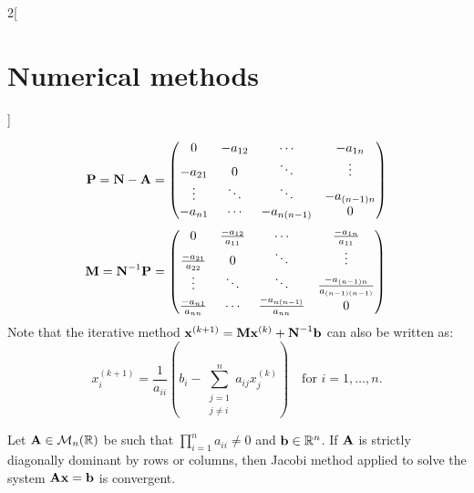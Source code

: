 \documentclass[../../../main.tex]{subfiles}
\begin{document}
\begin{multicols}{2}[\section{Numerical methods}]
\begin{definition}
        \begin{equation*}
            \boldsymbol{\mathrm{P}}=\boldsymbol{\mathrm{N}}-\boldsymbol{\mathrm{A}}=
            \begin{pmatrix}
                0       & -a_{12} & \cdots      & -a_{1n}     \\
                -a_{21} & 0       & \ddots      & \vdots      \\
                \vdots  & \ddots  & \ddots      & -a_{(n-1)n} \\
                -a_{n1} & \cdots  & -a_{n(n-1)} & 0
            \end{pmatrix}
        \end{equation*}
        \begin{equation*}
            \boldsymbol{\mathrm{M}}=\boldsymbol{\mathrm{N}}^{-1}\boldsymbol{\mathrm{P}}=
            \begin{pmatrix}
                0                      & \frac{-a_{12}}{a_{11}} & \cdots                     & \frac{-a_{1n}}{a_{11}}             \\
                \frac{-a_{21}}{a_{22}} & 0                      & \ddots                     & \vdots                             \\
                \vdots                 & \ddots                 & \ddots                     & \frac{-a_{(n-1)n}}{a_{(n-1)(n-1)}} \\
                \frac{-a_{n1}}{a_{nn}} & \cdots                 & \frac{-a_{n(n-1)}}{a_{nn}} & 0
            \end{pmatrix}\\
        \end{equation*}
        Note that the iterative method $\boldsymbol{\mathrm{x}}^{(k+1)}=\boldsymbol{\mathrm{M}}\boldsymbol{\mathrm{x}}^{(k)}+\boldsymbol{\mathrm{N}}^{-1}\boldsymbol{\mathrm{b}}$ can also be written as: $$x_i^{(k+1)}=\frac{1}{a_{ii}}\left(b_i-\sum_{\substack{j=1\\j\ne i}}^na_{ij}x_j^{(k)}\right)\quad\text{for }i=1,\ldots,n.$$
    \end{definition}
    \begin{theorem}
        Let $\boldsymbol{\mathrm{A}}\in\mathcal{M}_n(\mathbb{R})$ be such that $\prod_{i=1}^na_{ii}\ne 0$ and $\boldsymbol{\mathrm{b}}\in\mathbb{R}^n$. If $\boldsymbol{\mathrm{A}}$ is strictly diagonally dominant by rows or columns, then Jacobi method applied to solve the system $\boldsymbol{\mathrm{A}}\boldsymbol{\mathrm{x}}=\boldsymbol{\mathrm{b}}$ is convergent.
    \end{theorem}
    \begin{definition}

\end{definition}
\end{multicols}
\end{document}
